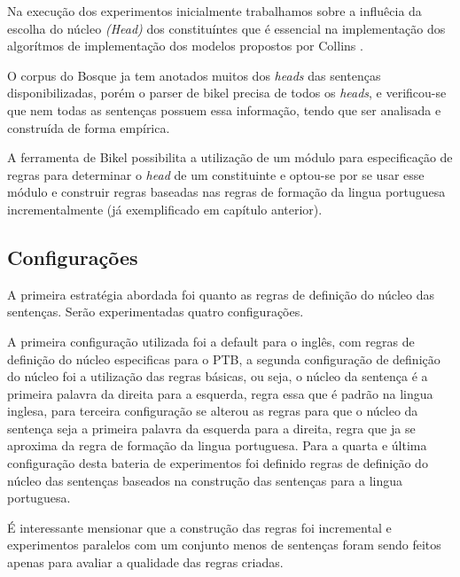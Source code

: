 




Na execução dos experimentos inicialmente trabalhamos sobre a influêcia da escolha do núcleo \emph{(Head)} dos constituíntes que é essencial na implementação dos algorítmos de implementação dos modelos propostos por Collins \cite{collins99}.

O corpus do Bosque ja tem anotados muitos dos \emph{heads} das sentenças disponibilizadas, porém o parser de bikel precisa de todos os \emph{heads}, e verificou-se que nem todas as sentenças possuem essa informação, tendo que ser analisada e construída de forma empírica.

A ferramenta de Bikel possibilita a utilização de um módulo para especificação de regras para determinar o \emph{head} de um constituinte e optou-se por se usar esse módulo e construir regras baseadas nas regras de formação da lingua portuguesa incrementalmente (já exemplificado em capítulo anterior). 

\subsection{Configurações}
\label{sec:configuracoes}

A primeira estratégia abordada foi quanto as regras de definição do núcleo das sentenças. Serão experimentadas quatro configurações.

A primeira configuração utilizada foi a default para o inglês, com regras de definição do núcleo especificas para o PTB, a segunda configuração de definição do núcleo foi a utilização das regras básicas, ou seja, o núcleo da sentença é a primeira palavra da direita para a esquerda, regra essa que é padrão na lingua inglesa, para terceira configuração se alterou as regras para que o núcleo da sentença seja a primeira palavra da esquerda para a direita, regra que ja se aproxima da regra de formação da lingua portuguesa. Para a quarta e última configuração desta bateria de experimentos foi definido regras de definição do núcleo das sentenças baseados na construção das sentenças para a lingua portuguesa.

É interessante mensionar que a construção das regras foi incremental e experimentos paralelos com um conjunto menos de sentenças foram sendo feitos apenas para avaliar a qualidade das regras criadas.

